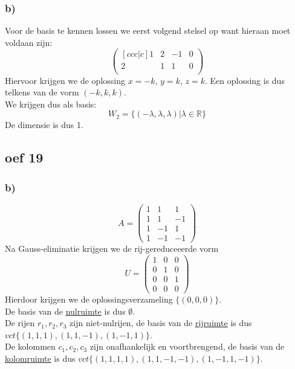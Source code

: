\documentclass[lineaire_algebra_oplossingen.tex]{subfiles}
\begin{document}
\subsubsection*{b)}
Voor de basis te kennen lossen we eerst volgend stelsel op want hieraan moet voldaan zijn:
$$
\begin{pmatrix}[c c c | c]
1 & 2&-1&0\\
2&1&1&0\\
\end{pmatrix}
$$
Hiervoor krijgen we de oplossing $x=-k$, $y= k$, $z=k$. Een oplossing is dus telkens van de vorm $(-k,k,k)$.\\
We krijgen dus als basis:
$$W_2 = \{(-\lambda, \lambda, \lambda)|\lambda \in \mathbb{R}\}$$
De dimensie is dus 1.
\subsection*{oef 19}
\subsubsection*{b)}
\[ A =
\begin{pmatrix}
  1 & 1 & 1\\
  1 & 1 & -1\\
  1 & -1 & 1\\
  1 & -1 & -1
\end{pmatrix}
\]
Na Gauss-eliminatie krijgen we de rij-gereduceeerde vorm
\[ U =
\begin{pmatrix}
  1 & 0 & 0\\
  0 & 1 & 0\\
  0 & 0 & 1\\
  0 & 0 & 0
\end{pmatrix}
\]
Hierdoor krijgen we de oplossingsverzameling $\{(0,0,0)\}$.\\
De basis van de \underline{nulruimte} is dus $\emptyset$.\\
De rijen $r_1, r_2, r_3$ zijn niet-nulrijen, de basis van de \underline{rijruimte} is dus $vct\{(1,1,1), (1,1,-1), (1,-1,1)\}$.\\
De kolommen $c_1, c_2, c_3$ zijn onafhankelijk en voortbrengend, de basis van de \underline{kolomruimte} is dus $vct\{(1,1,1,1), (1,1,-1,-1), (1,-1,1,-1)\}$.
\end{document}
